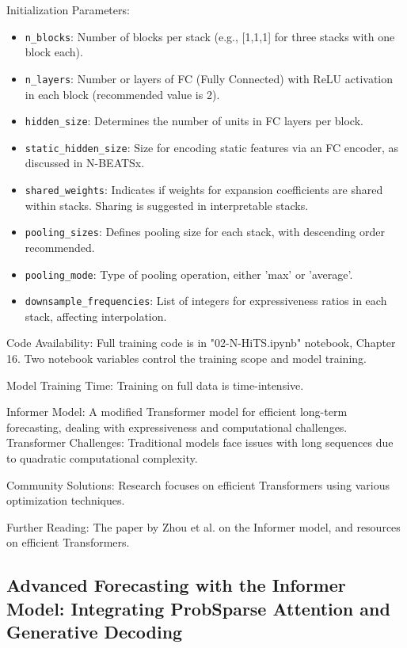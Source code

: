 \documentclass{article}
\begin{document}
Initialization Parameters:
\begin{itemize}
  \item \texttt{n\_blocks}: Number of blocks per stack (e.g., [1,1,1] for three stacks with one block each).
  \item \texttt{n\_layers}: Number or layers of FC (Fully Connected) with ReLU activation in each block (recommended value is 2).
  \item \texttt{hidden\_size}: Determines the number of units in FC layers per block.
  \item \texttt{static\_hidden\_size}: Size for encoding static features via an FC encoder, as discussed in N-BEATSx.
  \item \texttt{shared\_weights}: Indicates if weights for expansion coefficients are shared within stacks. Sharing is suggested in interpretable stacks.
  \item \texttt{pooling\_sizes}: Defines pooling size for each stack, with descending order recommended.
  \item \texttt{pooling\_mode}: Type of pooling operation, either 'max' or 'average'.
  \item \texttt{downsample\_frequencies}: List of integers for expressiveness ratios in each stack, affecting interpolation.
\end{itemize}

Code Availability: Full training code is in "02-N-HiTS.ipynb" notebook, Chapter 16. Two notebook variables control the training scope and model training.

Model Training Time: Training on full data is time-intensive.

Informer Model: A modified Transformer model for efficient long-term forecasting, dealing with expressiveness and computational challenges.
Transformer Challenges: Traditional models face issues with long sequences due to quadratic computational complexity.

Community Solutions: Research focuses on efficient Transformers using various optimization techniques.

Further Reading: The paper by Zhou et al. on the Informer model, and resources on efficient Transformers.

\subsection{Advanced Forecasting with the Informer Model: Integrating ProbSparse Attention and Generative Decoding}
\end{document}
